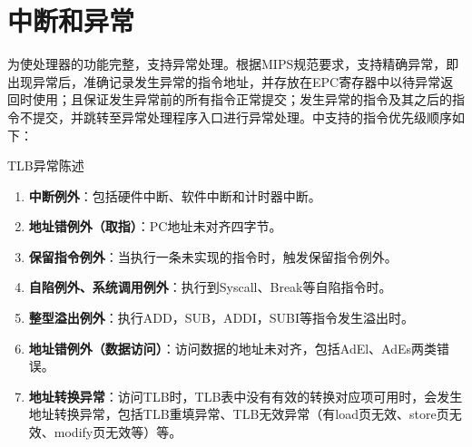 \section{中断和异常}
为使处理器的功能完整，\cpuname 支持异常处理。根据MIPS规范要求，\cpuname 支持精确异常，即出现异常后，准确记录发生异常的指令地址，并存放在EPC寄存器中以待异常返回时使用；且保证发生异常前的所有指令正常提交；发生异常的指令及其之后的指令不提交，并跳转至异常处理程序入口进行异常处理。\cpuname 中支持的指令优先级顺序如下：

\todo TLB异常陈述
\begin{enumerate}
    \item \textbf{中断例外}：包括硬件中断、软件中断和计时器中断。
    \item \textbf{地址错例外（取指）}：PC地址未对齐四字节。
    \item \textbf{保留指令例外}：当执行一条未实现的指令时，触发保留指令例外。
    \item \textbf{自陷例外、系统调用例外}：执行到Syscall、Break等自陷指令时。
    \item \textbf{整型溢出例外}：执行ADD，SUB，ADDI，SUBI等指令发生溢出时。
    \item \textbf{地址错例外（数据访问）}：访问数据的地址未对齐，包括AdEl、AdEs两类错误。
    \item \textbf{地址转换异常}：访问TLB时，TLB表中没有有效的转换对应项可用时，会发生地址转换异常，包括TLB重填异常、TLB无效异常（有load页无效、store页无效、modify页无效等）等。
\end{enumerate}
